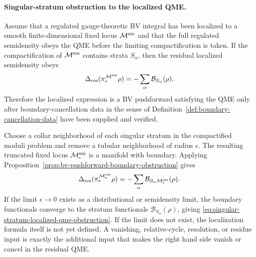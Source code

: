 \paragraph{Singular-stratum obstruction to the localized QME.}
Assume that a regulated gauge-theoretic BV integral has been localized to a
smooth finite-dimensional fixed locus \(\mathcal M^{\rm sm}\) and that the
full regulated semidensity obeys the QME before the limiting
compactification is taken.  If the compactification of
\(\mathcal M^{\rm sm}\) contains strata \(S_\alpha\), then the residual
localized semidensity obeys
\begin{equation}
  \Delta_{\rm res}(\pi_*^{\mathcal M^{\rm sm}}\rho)
  =
  -\sum_\alpha \mathcal B_{S_\alpha}(\rho).
  \label{eq:singular-stratum-localized-qme-obstruction}
\end{equation}
Therefore the localized expression is a BV pushforward satisfying the QME
only after boundary-cancellation data in the sense of
Definition~\ref{def:boundary-cancellation-data} have been supplied and
verified.

Choose a collar neighborhood of each singular stratum in the compactified
moduli problem and remove a tubular neighborhood of radius \(\epsilon\).
The resulting truncated fixed locus
\(\mathcal M_\epsilon^{\rm sm}\) is a manifold with boundary.  Applying
Proposition~\ref{prop:bv-pushforward-boundary-obstruction} gives
\begin{equation}
  \Delta_{\rm res}(\pi_*^{\mathcal M_\epsilon^{\rm sm}}\rho)
  =
  -\sum_\alpha
  \mathcal B_{\partial_\alpha\mathcal M_\epsilon^{\rm sm}}(\rho).
  \label{eq:singular-stratum-truncated-boundary}
\end{equation}
If the limit \(\epsilon\to0\) exists as a distributional or semidensity
limit, the boundary functionals converge to the stratum functionals
\(\mathcal B_{S_\alpha}(\rho)\), giving
\eqref{eq:singular-stratum-localized-qme-obstruction}.  If the limit does
not exist, the localization formula itself is not yet defined.  A vanishing,
relative-cycle, resolution, or residue input is exactly the additional input
that makes the right hand side vanish or cancel in the residual QME.

